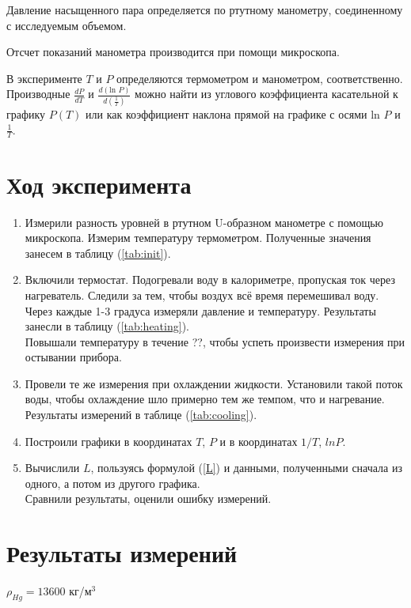 \documentclass[a4paper,12pt]{article} %
\begin{document}
Давление насыщенного пара определяется по ртутному манометру, соединенному с исследуемым объемом. 

Отсчет показаний манометра производится при помощи микроскопа. 

\bigskip
В эксперименте $T$ и $P$ определяются термометром и манометром, соответственно. Производные $\frac{dP}{dT}$ и $\frac{d(\mbox{ln }P)}{d(\frac1T)}$ можно найти из углового коэффициента касательной к графику $P(T)$ или как коэффициент наклона прямой на графике с осями ln $P$ и $\frac1T$.

\section{Ход эксперимента}

\begin{enumerate}
  \item Измерили разность уровней в ртутном U-образном манометре с помощью микроскопа. Измерим температуру термометром. Полученные значения занесем в таблицу (\ref{tab:init}).
  \item Включили термостат. Подогревали воду в калориметре, пропуская ток через нагреватель. Следили за тем, чтобы воздух всё время перемешивал воду. \\ Через каждые 1-3 градуса измеряли давление и температуру. Результаты занесли в таблицу (\ref{tab:heating}). \\ Повышали температуру в течение ??, чтобы успеть произвести измерения при остывании прибора.
  \item Провели те же измерения при охлаждении жидкости. Установили такой поток воды, чтобы охлаждение шло примерно тем же темпом, что и нагревание. Результаты измерений в таблице (\ref{tab:cooling}).
  \item Построили графики в координатах $T$, $P$ и в координатах $1/T$, $ln P$. %
  \item Вычислили $L$, пользуясь формулой (\ref{L}) и данными, полученными сначала из одного, а потом из другого графика. \\ Сравнили результаты, оценили ошибку измерений.
\end{enumerate}
\section{Результаты измерений}

$\rho_{Hg} = 13600$ кг/м$^3$
\end{document}
